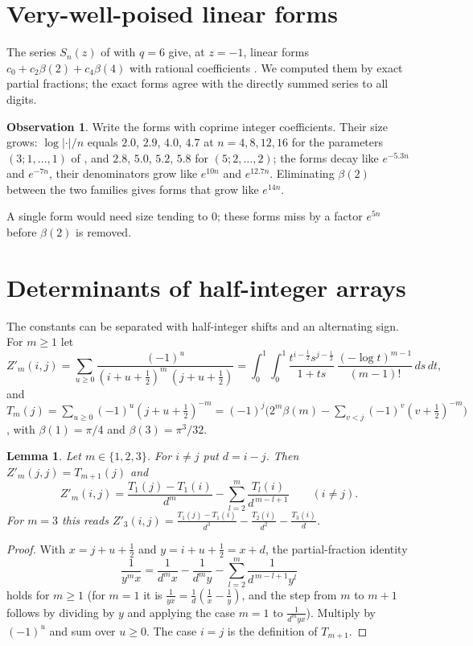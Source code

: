 \documentclass[11pt]{article}
\newtheorem{lemma}[theorem]{Lemma}
\theoremstyle{definition}
\newtheorem{observation}[theorem]{Observation}
\begin{document}
\section{Very-well-poised linear forms}\label{sec:vwp}

The series $S_n(z)$ of \cite[Eqs.~(5)--(7)]{RZ} with $q=6$ give, at $z=-1$, linear forms $c_0+c_2\beta(2)+c_4\beta(4)$ with rational coefficients \cite[Lemma~2]{RZ}. We computed them by exact partial fractions; the exact forms agree with the directly summed series to all digits.

\begin{observation}\label{obs:rz}
Write the forms with coprime integer coefficients. Their size grows: $\log|\cdot|/n$ equals $2.0$, $2.9$, $4.0$, $4.7$ at $n=4,8,12,16$ for the parameters $(3;1,\dots,1)$ of \cite[Eq.~(3)]{RZ}, and $2.8$, $5.0$, $5.2$, $5.8$ for $(5;2,\dots,2)$; the forms decay like $e^{-5.3n}$ and $e^{-7n}$, their denominators grow like $e^{10n}$ and $e^{12.7n}$. Eliminating $\beta(2)$ between the two families gives forms that grow like $e^{14n}$.
\end{observation}

A single form would need size tending to $0$; these forms miss by a factor $e^{5n}$ before $\beta(2)$ is removed.

\section{Determinants of half-integer arrays}\label{sec:halfint}

The constants can be separated with half-integer shifts and an alternating sign. For $m\ge1$ let
\[
Z'_m(i,j)=\sum_{u\ge0}\frac{(-1)^u}{(i+u+\frac12)^m\,(j+u+\frac12)}=\int_0^1\!\!\int_0^1\frac{t^{i-\frac12}s^{j-\frac12}}{1+ts}\,\frac{(-\log t)^{m-1}}{(m-1)!}\,ds\,dt,
\]
and $T_m(j)=\sum_{u\ge0}(-1)^u(j+u+\frac12)^{-m}=(-1)^j\big(2^m\beta(m)-\sum_{v<j}(-1)^v(v+\frac12)^{-m}\big)$, with $\beta(1)=\pi/4$ and $\beta(3)=\pi^3/32$.

\begin{lemma}\label{lem:halfint}
Let $m\in\{1,2,3\}$. For $i\ne j$ put $d=i-j$. Then $Z'_m(j,j)=T_{m+1}(j)$ and
\[
Z'_m(i,j)=\frac{T_1(j)-T_1(i)}{d^m}-\sum_{l=2}^{m}\frac{T_l(i)}{d^{\,m-l+1}}\qquad(i\ne j).
\]
For $m=3$ this reads $Z'_3(i,j)=\frac{T_1(j)-T_1(i)}{d^3}-\frac{T_2(i)}{d^2}-\frac{T_3(i)}{d}$.
\end{lemma}

\begin{proof}
With $x=j+u+\frac12$ and $y=i+u+\frac12=x+d$, the partial-fraction identity
\[
\frac1{y^mx}=\frac1{d^mx}-\frac1{d^my}-\sum_{l=2}^{m}\frac1{d^{\,m-l+1}y^l}
\]
holds for $m\ge1$ (for $m=1$ it is $\frac1{yx}=\frac1d(\frac1x-\frac1y)$, and the step from $m$ to $m+1$ follows by dividing by $y$ and applying the case $m=1$ to $\frac1{d^m yx}$). Multiply by $(-1)^u$ and sum over $u\ge0$. The case $i=j$ is the definition of $T_{m+1}$.
\end{proof}
\end{document}
